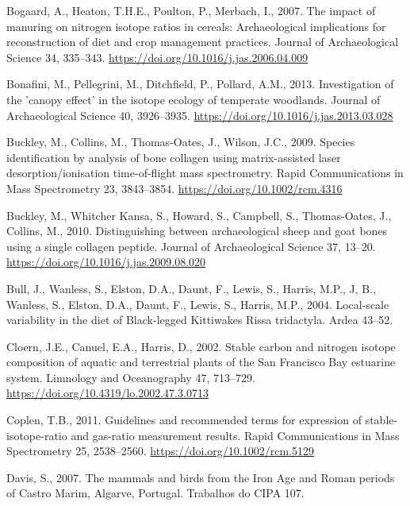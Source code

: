 \documentclass[preprint, 3p, authoryear]{elsarticle} %
\newlength{\cslhangindent}
\newlength{\cslentryspacingunit} %
\newenvironment{CSLReferences}[2] %
 {%
  \setlength{\parindent}{0pt}
  \ifodd #1
  \let\oldpar\par
  \def\par{\hangindent=\cslhangindent\oldpar}
  \fi
  \setlength{\parskip}{#2\cslentryspacingunit}
 }%
 {}
\begin{document}
\begin{CSLReferences}{1}{0}
\leavevmode{}%
Bogaard, A., Heaton, T.H.E., Poulton, P., Merbach, I., 2007. The impact of manuring on nitrogen isotope ratios in cereals: Archaeological implications for reconstruction of diet and crop management practices. Journal of Archaeological Science 34, 335--343. \url{https://doi.org/10.1016/j.jas.2006.04.009}

\leavevmode{}%
Bonafini, M., Pellegrini, M., Ditchfield, P., Pollard, A.M., 2013. Investigation of the 'canopy effect' in the isotope ecology of temperate woodlands. Journal of Archaeological Science 40, 3926--3935. \url{https://doi.org/10.1016/j.jas.2013.03.028}

\leavevmode{}%
Buckley, M., Collins, M., Thomas‐Oates, J., Wilson, J.C., 2009. Species identification by analysis of bone collagen using matrix-assisted laser desorption/ionisation time-of-flight mass spectrometry. Rapid Communications in Mass Spectrometry 23, 3843--3854. \url{https://doi.org/10.1002/rcm.4316}

\leavevmode{}%
Buckley, M., Whitcher Kansa, S., Howard, S., Campbell, S., Thomas-Oates, J., Collins, M., 2010. Distinguishing between archaeological sheep and goat bones using a single collagen peptide. Journal of Archaeological Science 37, 13--20. \url{https://doi.org/10.1016/j.jas.2009.08.020}

\leavevmode{}%
Bull, J., Wanless, S., Elston, D.A., Daunt, F., Lewis, S., Harris, M.P., J, B., Wanless, S., Elston, D.A., Daunt, F., Lewis, S., Harris, M.P., 2004. Local-scale variability in the diet of {Black}-legged {Kittiwakes Rissa} tridactyla. Ardea 43--52.

\leavevmode{}%
Cloern, J.E., Canuel, E.A., Harris, D., 2002. Stable carbon and nitrogen isotope composition of aquatic and terrestrial plants of the {San Francisco Bay} estuarine system. Limnology and Oceanography 47, 713--729. \url{https://doi.org/10.4319/lo.2002.47.3.0713}

\leavevmode{}%
Coplen, T.B., 2011. Guidelines and recommended terms for expression of stable-isotope-ratio and gas-ratio measurement results. Rapid Communications in Mass Spectrometry 25, 2538--2560. \url{https://doi.org/10.1002/rcm.5129}

\leavevmode{}%
Davis, S., 2007. The mammals and birds from the {Iron Age} and {Roman} periods of {Castro Marim}, {Algarve}, {Portugal}. Trabalhos do CIPA 107.


\end{CSLReferences}
\end{document}
